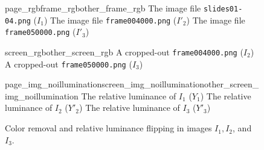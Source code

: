 \begin{figure}
    {page_rgb}{frame_rgb}{other_frame_rgb}%
    {The image file \texttt{slides01-04.png} ($I_1$)}%
    {The image file \texttt{frame004000.png} ($I'_2$)}%
    {The image file \texttt{frame050000.png} ($I'_3$)}\par
    {screen_rgb}{other_screen_rgb}%
    {A cropped-out \texttt{frame004000.png} ($I_2$)}%
    {A cropped-out \texttt{frame050000.png} ($I_3$)}
  \caption{Cropping out a screen from two different video frame images, one
    matching the given lecture slide page and the other one not.}
  \label{fig:preprocessing-first}

  \kern\floatsep
    {page_img_noillumination}{screen_img_noillumination}{other_screen_img_noillumination}%
    {The relative luminance of $I_1$ ($Y_1$)}%
    {The relative luminance of $I_2$ ($Y'_2$)}%
    {The relative luminance of $I_3$ ($Y'_3$)}
  \caption{Color removal and relative luminance flipping in images $I_1,
    I_2$, and~$I_3$.}
\end{figure}
